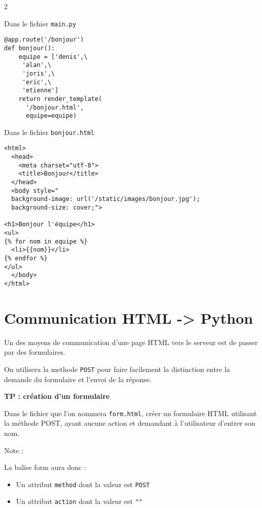 \documentclass[12pt,a4paper]{article}
\begin{document}
\begin{multicols}2

Dans le fichier \texttt{main.py}

\begin{verbatim}
@app.route('/bonjour')
def bonjour():
    equipe = ['denis',\
     'alan',\
     'joris',\
     'eric',\
     'etienne']
    return render_template(
      '/bonjour.html',
      equipe=equipe)
\end{verbatim}

\columnbreak


Dans le fichier \texttt{bonjour.html}

\begin{verbatim}
<html>
  <head>
    <meta charset="utf-8">
    <title>Bonjour</title> 
  </head>
  <body style="
  background-image: url('/static/images/bonjour.jpg');
  background-size: cover;">
    
<h1>Bonjour l'équipe</h1>
<ul>
{% for nom in equipe %}
  <li>{{nom}}</li>
{% endfor %}
</ul>
  </body>
</html>
\end{verbatim}

\end{multicols}


 \section{Communication HTML -> Python}
 

Un des moyens de communication d'une page HTML vers  le serveur est de passer par des formulaires.

On utilisera la methode \texttt{POST} pour faire facilement la distinction entre la demande du formulaire et l'envoi de la réponse. 

\bigskip

\textbf{TP : création d'un formulaire}

\medskip

Dans le fichier que l'on nommera \texttt{form.html}, créer un formulaire HTML utilisant la méthode POST, ayant aucune action et  demandant à l'utilisateur d'entrer son nom.

\par 

Note : \par 
La balise form aura donc : 
\begin{itemize}
  \item Un attribut \texttt{method} dont la valeur est \texttt{POST}
  \item Un attribut \texttt{action} dont la valeur est \texttt{""}
\end{itemize}
\end{document}
